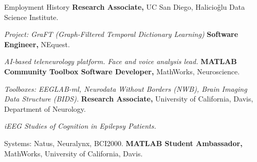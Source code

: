 \begin{rubric}{Employment History}
%
	\textbf{Research Associate,} UC San Diego, Halicio\v{g}lu Data Science Institute.

        \textit{Project: GraFT (Graph-Filtered Temporal Dictionary Learning)}
%
%
%
        \textbf{Software Engineer,} NEquest. 
        
        \textit{AI-based teleneurology platform. Face and voice analysis lead.}
%
\entry*[2022 -- 2023]%
	\textbf{MATLAB Community Toolbox Software Developer,} MathWorks, Neuroscience.

        \textit{Toolboxes: EEGLAB-ml, Neurodata Without Borders (NWB), Brain Imaging Data Structure (BIDS).}
%
\entry*[2022 -- 2023]%
        \textbf{Research Associate,} University of California, Davis, Department of Neurology.

        \textit{iEEG Studies of Cognition in Epilepsy Patients.}
        
        Systems: Natus, Neuralynx, BCI2000.
%
\entry*[2020 -- 2022]%
        \textbf{MATLAB Student Ambassador,} MathWorks, University of California, Davis.
%
\end{rubric}